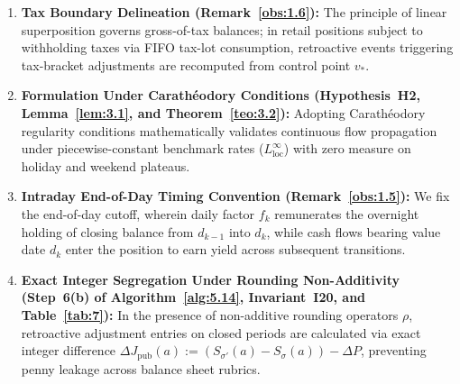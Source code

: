 \documentclass[11pt, a4paper]{article}
\theoremstyle{definition}
\theoremstyle{plain}
\theoremstyle{remark}
\begin{document}
\begin{enumerate}[label=\textbf{\arabic*.}]
    \item \textbf{Tax Boundary Delineation (Remark~\ref{obs:1.6}):} The principle of linear superposition governs gross-of-tax balances; in retail positions subject to withholding taxes via FIFO tax-lot consumption, retroactive events triggering tax-bracket adjustments are recomputed from control point $v_*$.
    \item \textbf{Formulation Under Carathéodory Conditions (Hypothesis~H2, Lemma~\ref{lem:3.1}, and Theorem~\ref{teo:3.2}):} Adopting Carathéodory regularity conditions mathematically validates continuous flow propagation under piecewise-constant benchmark rates ($L^\infty_{\text{loc}}$) with zero measure on holiday and weekend plateaus.
    \item \textbf{Intraday End-of-Day Timing Convention (Remark~\ref{obs:1.5}):} We fix the end-of-day cutoff, wherein daily factor $f_k$ remunerates the overnight holding of closing balance from $d_{k-1}$ into $d_k$, while cash flows bearing value date $d_k$ enter the position to earn yield across subsequent transitions.
    \item \textbf{Exact Integer Segregation Under Rounding Non-Additivity (Step~6(b) of Algorithm~\ref{alg:5.14}, Invariant~I20, and Table~\ref{tab:7}):} In the presence of non-additive rounding operators $\rho$, retroactive adjustment entries on closed periods are calculated via exact integer difference $\Delta J_{\text{pub}}(a) := (S_{\sigma'}(a) - S_\sigma(a)) - \Delta P$, preventing penny leakage across balance sheet rubrics.
\end{enumerate}
\end{document}
